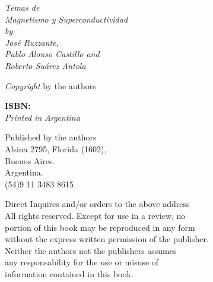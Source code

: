 \documentclass[
11pt, %
spanish,
singlespacing, %
parskip, %
headsepline, %
]{MastersDoctoralThesis} %
\begin{document}
\newpage
\begin{flushleft}
\begin{small}

\vspace{10.0cm} 

\vfill

\textit{Temas de \\ Magnetismo y Superconductividad \\
by \\
José Ruzzante, \\ %
Pablo Alonso Castillo and \\ %
Roberto Suárez Antola}
\vspace{5mm} 

\textit{Copyright}  by the authors
\vspace{5mm} 

\textbf{ISBN:} \\
\textit{Printed in Argentina}
\vspace{5mm} 

Published by the authors\\ 
Alsina 2795, Florida (1602),\\
Buenos Aires.\\
Argentina.\\
(54)9 11 3483 8615
\vspace{5mm} 

Direct Inquires and/or orders to the above address\\
\vspace{5mm} 
All rights reserved. Except for use in a review, no\\
portion of this book may be reproduced in any form\\
without the express written permission of the publisher.\\
\vspace{5mm} 
Neither the authors not the publishers assumes\\
any responsability for the use or misuse of\\
information contained in this book.\\


\end{small}
\end{flushleft} 
\end{document}
